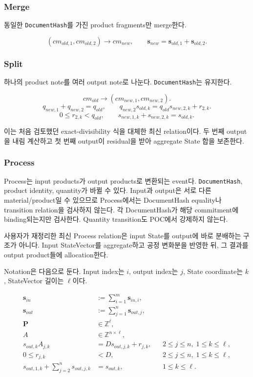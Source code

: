 \documentclass[11pt]{extarticle}
\begin{document}
\subsubsection{Merge}\label{merge}

동일한 \texttt{DocumentHash}를 가진 product fragments만 merge한다.

\[
(cm_{old,1},cm_{old,2})\longrightarrow cm_{new},
\qquad
\mathbf{s}_{new}=\mathbf{s}_{old,1}+\mathbf{s}_{old,2}.
\]

\subsubsection{Split}\label{split}

하나의 product note를 여러 output note로 나눈다. \texttt{DocumentHash}는
유지한다.

\[
cm_{old}\longrightarrow(cm_{new,1},cm_{new,2}).
\]
\[
q_{new,1}+q_{new,2}=q_{old},
\qquad
q_{new,2}s_{old,k}=q_{old}s_{new,2,k}+r_{2,k}.
\]
\[
0\leq r_{2,k}<q_{old},
\qquad
s_{new,1,k}+s_{new,2,k}=s_{old,k}.
\]

이는 처음 검토했던 exact-divisibility 식을 대체한 최신 relation이다. 두 번째 output을
내림 계산하고 첫 번째 output이 residual을 받아 aggregate State 합을 보존한다.

\subsubsection{Process}\label{process}

Process는 input products가 output products로 변환되는 event다.
\texttt{DocumentHash}, product identity, quantity가 바뀔 수 있다.
Input과 output은 서로 다른 material/product일 수 있으므로 Process에서는 DocumentHash
equality나 transition relation을 검사하지 않는다. 각 DocumentHash가 해당 commitment에
binding되는지만 검사한다. Quantity transition도 POC에서 강제하지 않는다.

사용자가 재정리한 최신 Process relation은 input State를 output에 바로 분배하는
구조가 아니다. Input StateVector를 aggregate하고 공정 변화분을 반영한 뒤, 그 결과를
output product들에 allocation한다.

Notation은 다음으로 둔다. Input index는 $i$, output index는 $j$, State coordinate는
$k$, StateVector 길이는 $\ell$이다.

\[
\begin{aligned}
\mathbf{s}_{in}&:=\sum_{i=1}^{m}\mathbf{s}_{in,i},\\
\mathbf{s}_{out}&:=\sum_{j=1}^{n}\mathbf{s}_{out,j},\\
\mathbf{P} &\in \mathbb{Z}^{\ell},\\
A &\in \mathbb{Z}^{n\times\ell},\\
s_{out,k}A_{j,k} &= Ds_{out,j,k}+r_{j,k},
&& 2\leq j\leq n,\;1\leq k\leq\ell,\\
0\leq r_{j,k}&<D,
&& 2\leq j\leq n,\;1\leq k\leq\ell,\\
s_{out,1,k}+\sum_{j=2}^{n}s_{out,j,k}&=s_{out,k},
&& 1\leq k\leq\ell.
\end{aligned}
\]
\end{document}
